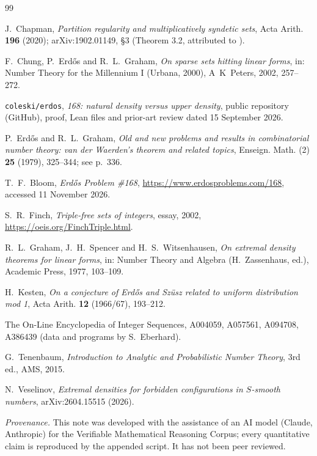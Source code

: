\documentclass[11pt]{amsart}
\theoremstyle{definition}
\begin{document}
\begin{thebibliography}{99}

 J.~Chapman, \emph{Partition regularity and multiplicatively syndetic sets}, Acta Arith. \textbf{196} (2020); arXiv:1902.01149, \S3 (Theorem 3.2, attributed to \cite{GSW77}).

 F.~Chung, P.~Erd\H{o}s and R.~L.~Graham, \emph{On sparse sets hitting linear forms}, in: Number Theory for the Millennium I (Urbana, 2000), A~K~Peters, 2002, 257--272.

 \texttt{coleski/erdos}, \emph{168: natural density versus upper density}, public repository (GitHub), proof, Lean files and prior-art review dated 15 September 2026.

 P.~Erd\H{o}s and R.~L.~Graham, \emph{Old and new problems and results in combinatorial number theory: van der Waerden's theorem and related topics}, Enseign. Math. (2) \textbf{25} (1979), 325--344; see p.~336.

 T.~F.~Bloom, \emph{Erd\H{o}s Problem \#168}, \url{https://www.erdosproblems.com/168}, accessed 11 November 2026.

 S.~R.~Finch, \emph{Triple-free sets of integers}, essay, 2002, \url{https://oeis.org/FinchTriple.html}.

 R.~L.~Graham, J.~H.~Spencer and H.~S.~Witsenhausen, \emph{On extremal density theorems for linear forms}, in: Number Theory and Algebra (H.~Zassenhaus, ed.), Academic Press, 1977, 103--109.

 H.~Kesten, \emph{On a conjecture of Erd\H{o}s and Sz\"usz related to uniform distribution mod 1}, Acta Arith. \textbf{12} (1966/67), 193--212.

 The On-Line Encyclopedia of Integer Sequences, A004059, A057561, A094708, A386439 (data and programs by S.~Eberhard).

 G.~Tenenbaum, \emph{Introduction to Analytic and Probabilistic Number Theory}, 3rd ed., AMS, 2015.

 N.~Veselinov, \emph{Extremal densities for forbidden configurations in $S$-smooth numbers}, arXiv:2604.15515 (2026).

\end{thebibliography}

\bigskip
\noindent\small\emph{Provenance.} This note was developed with the assistance of an AI model (Claude, Anthropic) for the Verifiable Mathematical Reasoning Corpus; every quantitative claim is reproduced by the appended script. It has not been peer reviewed.
\end{document}
